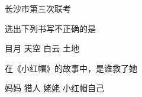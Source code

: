 \documentclass[addpoints,answers]{exam}
\begin{document}
\begin{center}
    \Huge 长沙市第三次联考
\end{center}
\begin{questions}

\question[10] 选出下列书写不正确的是

\begin{oneparchoices}
\choice 目月
\choice 天空
\choice 白云
\choice 土地
\end{oneparchoices}

\question[10] 在《小红帽》的故事中，是谁救了她

\begin{oneparchoices}
\choice 妈妈
\choice 猎人
\choice 姥姥
\choice 小红帽自己
\end{oneparchoices}

\end{questions}
\end{document}
